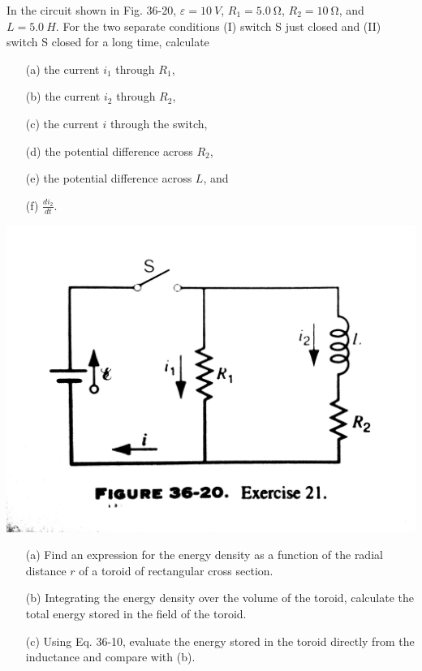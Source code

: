 \documentclass[12pt,letterpaper,boxed,cm]{hmcpset}
\newcommand{\f}[2]{\frac{#1}{#2}}
\begin{document}


\begin{problem}[36-E21]
	In the circuit shown in Fig. 36-20, $\varepsilon = \SI{10}{V}$, $R_1 = \SI{5.0}{\ohm}$, $R_2 = \SI{10}{\ohm}$, and $L = \SI{5.0}{H}$. For the two separate conditions (I) switch S just closed and (II) switch S closed for a long time, calculate
	\begin{enumerate}
		\item[(a)] the current $i_1$ through $R_1$,
		\item[(b)] the current $i_2$ through $R_2$,
		\item[(c)] the current $i$ through the switch,
		\item[(d)] the potential difference across $R_2$,
		\item[(e)] the potential difference across $L$, and
		\item[(f)] $\f{di_2}{dt}$.
	\end{enumerate}
	\begin{center}
		\includegraphics[scale=0.1]{01.jpg}
	\end{center}
\end{problem}
\begin{solution}
\end{solution}
\newpage


\begin{problem}[36-P9]
	\begin{enumerate}
		\item[(a)] Find an expression for the energy density as a function of the radial distance $r$ of a toroid of rectangular cross section.
		\item[(b)] Integrating the energy density over the volume of the toroid, calculate the total energy stored in the field of the toroid.
		\item[(c)] Using Eq. 36-10, evaluate the energy stored in the toroid directly from the inductance and compare with (b).
	\end{enumerate}
\end{problem}
\begin{solution}
\end{solution}
\end{document}
